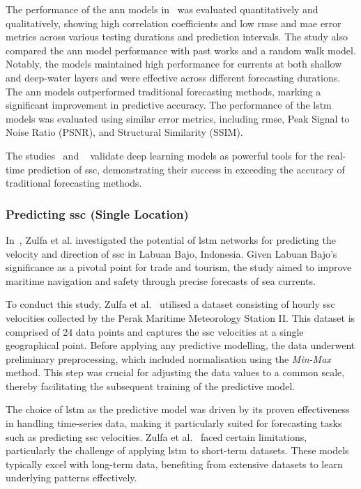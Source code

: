 The performance of the \acrshort{ann} models in~\cite{41} was evaluated quantitatively and qualitatively, showing high correlation coefficients and low \acrshort{rmse} and \acrshort{mae} error metrics across various testing durations and prediction intervals. The study also compared the \acrshort{ann} model performance with past works and a random walk model. Notably, the models maintained high performance for currents at both shallow and deep-water layers and were effective across different forecasting durations. The \acrshort{ann} models outperformed traditional forecasting methods, marking a significant improvement in predictive accuracy. The performance of the \acrshort{lstm} models was evaluated using similar error metrics, including \acrshort{rmse}, Peak Signal to Noise Ratio (PSNR), and Structural Similarity (SSIM). 

The studies~\cite{41} and ~\cite{42} validate deep learning models as powerful tools for the real-time prediction of \acrshort{ssc}, demonstrating their success in exceeding the accuracy of traditional forecasting methods.

\subsubsection{Predicting \acrshort{ssc} (Single Location)}
\label{subsubsec:2.2.2.2}

In~\cite{43}, Zulfa et al. investigated the potential of \acrshort{lstm} networks for predicting the velocity and direction of \acrshort{ssc} in Labuan Bajo, Indonesia. Given Labuan Bajo's significance as a pivotal point for trade and tourism, the study aimed to improve maritime navigation and safety through precise forecasts of sea currents.

To conduct this study, Zulfa et al.~\cite{43} utilised a dataset consisting of hourly \acrshort{ssc} velocities collected by the Perak Maritime Meteorology Station II. This dataset is comprised of 24 data points and captures the \acrshort{ssc} velocities at a single geographical point. Before applying any predictive modelling, the data underwent preliminary preprocessing, which included normalisation using the \textit{Min-Max} method. This step was crucial for adjusting the data values to a common scale, thereby facilitating the subsequent training of the predictive model.

The choice of \acrshort{lstm} as the predictive model was driven by its proven effectiveness in handling time-series data, making it particularly suited for forecasting tasks such as predicting \acrshort{ssc} velocities. Zulfa et al.~\cite{43} faced certain limitations, particularly the challenge of applying \acrshort{lstm} to short-term datasets. These models typically excel with long-term data, benefiting from extensive datasets to learn underlying patterns effectively. 

